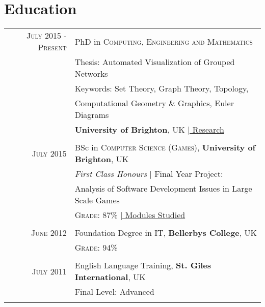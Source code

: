 \documentclass[a4paper,10pt]{article} %
\begin{document}
\section{Education}

\begin{tabular}{r|p{11cm}}
\textsc{July 2015 - Present} & PhD in \textsc{Computing, Engineering and Mathematics}\\
& Thesis: Automated Visualization of Grouped Networks\\
& Keywords: Set Theory, Graph Theory, Topology,\\
& Computational Geometry \& Graphics, Euler Diagrams \\
& \textbf{University of Brighton}, UK \hyperlink{papers}{\hfill | \footnotesize Research}\\
\multicolumn{2}{c}{} \\

	
\textsc{July} 2015 & BSc in \textsc{Computer Science (Games)}, \textbf{University of Brighton}, UK\\
& \small\emph{First Class Honours} | Final Year Project: \\
& Analysis of Software Development Issues in Large Scale Games\\
&\normalsize \textsc{Grade}: 87\% \hyperlink{grds}{\hfill | \footnotesize Modules Studied}\\
\multicolumn{2}{c}{} \\


\textsc{June} 2012 & Foundation Degree in \textsc{IT}, \normalsize\textbf{Bellerbys College}, UK\\
&\normalsize \textsc{Grade}: 94\% \\
\multicolumn{2}{c}{} \\


\textsc{July} 2011 & English Language Training, \textbf{St. Giles International}, UK \\
& Final Level: Advanced\\
\multicolumn{2}{c}{} \\

\end{tabular}
\vspace{1cm}

\end{document}
